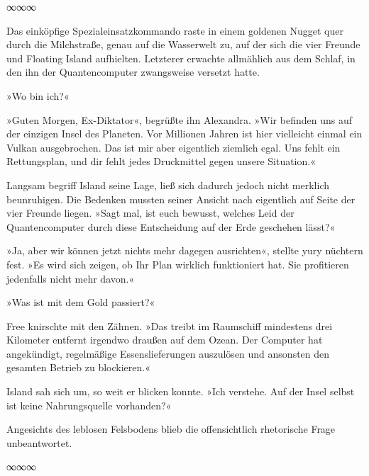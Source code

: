 \begin{center}
∞∞∞
\end{center}

Das einköpfige Spezialeinsatzkommando raste in einem goldenen Nugget quer durch die Milchstraße, genau auf die Wasserwelt zu, auf der sich die vier Freunde und Floating Island aufhielten. Letzterer erwachte allmählich aus dem Schlaf, in den ihn der Quantencomputer zwangsweise versetzt hatte.

»Wo bin ich?«

»Guten Morgen, Ex-Diktator«, begrüßte ihn Alexandra. »Wir befinden uns auf der einzigen Insel des Planeten. Vor Millionen Jahren ist hier vielleicht einmal ein Vulkan ausgebrochen. Das ist mir aber eigentlich ziemlich egal. Uns fehlt ein Rettungsplan, und dir fehlt jedes Druckmittel gegen unsere Situation.«

Langsam begriff Island seine Lage, ließ sich dadurch jedoch nicht merklich beunruhigen. Die Bedenken mussten seiner Ansicht nach eigentlich auf Seite der vier Freunde liegen. »Sagt mal, ist euch bewusst, welches Leid der Quantencomputer durch diese Entscheidung auf der Erde geschehen lässt?«

»Ja, aber wir können jetzt nichts mehr dagegen ausrichten«, stellte yury nüchtern fest. »Es wird sich zeigen, ob Ihr Plan wirklich funktioniert hat. Sie profitieren jedenfalls nicht mehr davon.«

»Was ist mit dem Gold passiert?«

Free knirschte mit den Zähnen. »Das treibt im Raumschiff mindestens drei Kilometer entfernt irgendwo draußen auf dem Ozean. Der Computer hat angekündigt, regelmäßige Essenslieferungen auszulösen und ansonsten den gesamten Betrieb zu blockieren.«

Island sah sich um, so weit er blicken konnte. »Ich verstehe. Auf der Insel selbst ist keine Nahrungsquelle vorhanden?«

Angesichts des leblosen Felsbodens blieb die offensichtlich rhetorische Frage unbeantwortet.

\begin{center}
∞∞∞
\end{center}

